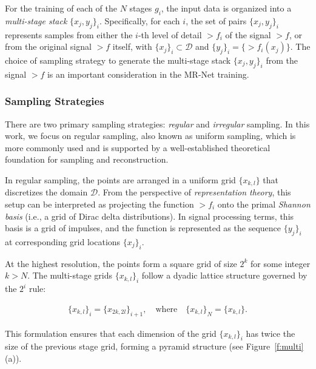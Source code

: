 For the training of each of the \( N \) stages \( g_i \), the input data is organized into a \textit{multi-stage stack} \(\{x_j, y_j\}_i\). Specifically, for each \( i \), the set of pairs \(\{x_j, y_j\}_i\) represents samples from either the \( i \)-th level of detail \(\gt{f}_i\) of the signal \(\gt{f}\), or from the original signal \(\gt{f}\) itself, with \(\{x_j\}_i \subset \mathcal{D}\) and \(\{y_j\}_i = \{\gt{f}_i(x_j)\}\). The choice of sampling strategy to generate the multi-stage stack \(\{x_j, y_j\}_i\) from the signal \(\gt{f}\) is an important consideration in the MR-Net training.


\subsubsection{Sampling Strategies}

There are two primary sampling strategies: \textit{regular} and \textit{irregular} sampling. In this work, we focus on regular sampling, also known as uniform sampling, which is more commonly used and is supported by a well-established theoretical foundation for sampling and reconstruction. 

In regular sampling, the points are arranged in a uniform grid \(\{x_{k,l}\}\) that discretizes the domain \(\mathcal{D}\). From the perspective of \textit{representation theory}, this setup can be interpreted as projecting the function \(\gt{f}_i\) onto the primal \textit{Shannon basis} (i.e., a grid of Dirac delta distributions). In signal processing terms, this basis is a grid of impulses, and the function is represented as the sequence \(\{y_j\}_i\) at corresponding grid locations \(\{x_j\}_i\).

At the highest resolution, the points form a square grid of size \( 2^k \) for some integer \( k > N \). The multi-stage grids \(\{x_{k,l}\}_i\) follow a dyadic lattice structure governed by the \( 2^i \) rule:

\begin{align}
    \{x_{k,l}\}_i = \{x_{2k, 2l}\}_{i+1}, \quad \text{where} \quad \{x_{k,l}\}_N = \{x_{k,l}\}.
\end{align}


This formulation ensures that each dimension of the grid \(\{x_{k,l}\}_i\) has twice the size of the previous stage grid, forming a pyramid structure (see Figure~\ref{f:multi}(a)).

